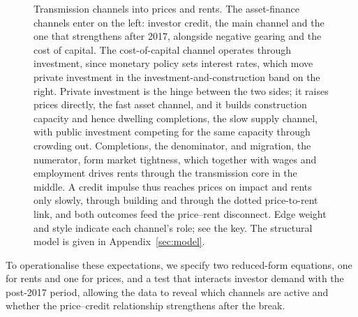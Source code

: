 \documentclass[preprint,11pt,authoryear]{elsarticle}
\begin{document}
\begin{figure}[!htp]
{{%
}%
}
\EndAccSupp{}
\caption{Transmission channels into prices and rents. The asset-finance
channels enter on the left: investor credit, the main channel and the one
that strengthens after 2017, alongside negative gearing and the cost of
capital. The cost-of-capital channel operates through investment, since
monetary policy sets interest rates, which move private investment in the
investment-and-construction band on the right. Private investment is the
hinge between the two sides; it raises prices directly, the fast asset
channel, and it builds construction capacity and hence dwelling
completions, the slow supply channel, with public investment competing for
the same capacity through crowding out. Completions, the denominator, and
migration, the numerator, form market tightness, which together with
wages and employment drives rents through the transmission core in the
middle. A credit impulse thus reaches prices on impact and rents only
slowly, through building and through the dotted price-to-rent link, and
both outcomes feed the price--rent disconnect. Edge weight and style
indicate each channel's role; see the key. The structural model is given
in Appendix~\ref{sec:model}.}
\label{fig:transmission}
\end{figure}

To operationalise these expectations, we specify two reduced-form
equations, one for rents and one for prices, and a test that interacts
investor demand with the post-2017 period, allowing the data to reveal
which channels are active and whether the price--credit relationship
strengthens after the break.
\end{document}

